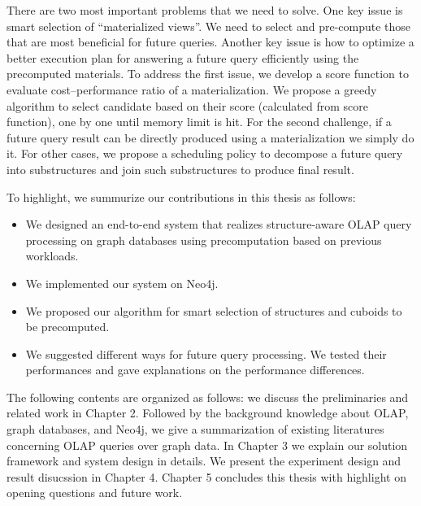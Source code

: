 There are two most important problems that we need to solve. One key issue is smart selection of ``materialized views''. We need to select and pre-compute those that are most beneficial for future queries. Another key issue is how to optimize a better execution plan for answering a future query efficiently using the precomputed materials. 
To address the first issue, we develop a score function to evaluate cost–performance ratio of a materialization. We propose a greedy  algorithm to  select candidate  based on their score (calculated from score function), one by one until memory limit is hit. For the second challenge, if a future query result can be directly produced using a materialization we simply do it. For other cases, we propose a scheduling policy to decompose a future query into substructures and join such substructures to produce final result.  

To highlight, we summurize our contributions in this thesis as follows:
\begin{itemize}
\item {We designed an end-to-end system that realizes structure-aware OLAP query processing on graph databases using precomputation based on previous workloads.}

\item We implemented our system on Neo4j.

\item We proposed our algorithm for smart selection of structures and cuboids to be precomputed.
 
\item We suggested different ways for future query processing. We tested their performances and gave explanations on the performance differences.
 
 \end{itemize}

The following contents are organized as follows:
 we discuss the preliminaries and related work in Chapter 2. Followed by the background knowledge about  OLAP, graph databases, and Neo4j, we give a summarization of existing literatures concerning OLAP queries over graph data. In Chapter 3 we explain our solution framework and system design in details. We present the experiment design and result disucssion in Chapter 4. Chapter 5 concludes this thesis with highlight on opening questions and future work.

